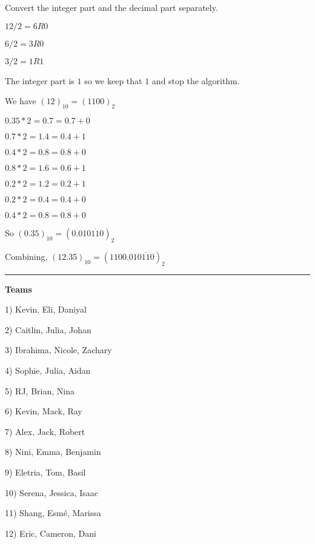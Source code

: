 \documentclass[12pt,letterpaper,noanswers]{exam}
\begin{document}
Convert the integer part and the decimal part separately.
\begin{multicols}{2}

$12/2 = 6 R0$

$6/2 = 3 R0$

$3/2 = 1 R1$

The integer part is $1$ so we keep that $1$ and stop the algorithm.

We have $(12)_{10} = (1100)_2 $

\columnbreak

$0.35 * 2 = 0.7 = 0.7 + 0$

$0.7*2 = 1.4 = 0.4 + 1$

$0.4*2 = 0.8 = 0.8 + 0$

$0.8*2 = 1.6 = 0.6 + 1$

$0.2*2 = 1.2 = 0.2 + 1$

$0.2*2 = 0.4 = 0.4 + 0$

$0.4*2 = 0.8 = 0.8 + 0$

So $(0.35)_{10} = (0.01\overline{0110})_2$

\end{multicols}

Combining, $(12.35)_{10} = (1100.01\overline{0110})_2$

\vspace{0.2cm}
\hrule
\vspace{0.2cm}

\noindent \textbf{Teams}

\begin{multicols}{3}
1) Kevin, Eli, Daniyal

2) Caitlin, Julia, Johan

3) Ibrahima, Nicole, Zachary

4) Sophie, Julia, Aidan

5) RJ, Brian, Nina

6) Kevin, Mack, Ray

7) Alex, Jack, Robert

8) Nini, Emma, Benjamin

9) Eletria, Tom, Basil

10) Serena, Jessica, Isaac

11) Shang, Esmé, Marissa

12) Eric, Cameron, Dani
\end{multicols}

\end{document}
